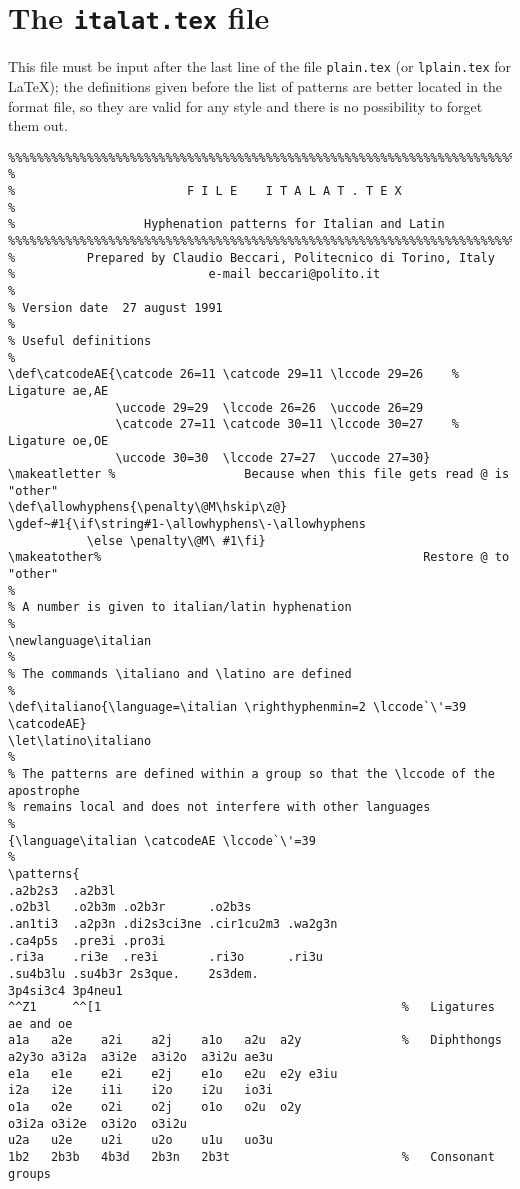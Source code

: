 \section{The {\tt italat.tex} file}
This  file must be input after the last line of the file {\tt plain.tex} (or
{\tt lplain.tex} for \LaTeX); the  definitions  given  before  the  list  of
patterns  are  better  located in the format file, so they are valid for any
style and there is no possibility to forget them out.
 \small
\begin{verbatim}
%%%%%%%%%%%%%%%%%%%%%%%%%%%%%%%%%%%%%%%%%%%%%%%%%%%%%%%%%%%%%%%%%%%%%%%%%%%%
%
%                        F I L E    I T A L A T . T E X
%
%                  Hyphenation patterns for Italian and Latin
%%%%%%%%%%%%%%%%%%%%%%%%%%%%%%%%%%%%%%%%%%%%%%%%%%%%%%%%%%%%%%%%%%%%%%%%%%%%
%          Prepared by Claudio Beccari, Politecnico di Torino, Italy
%                           e-mail beccari@polito.it
%
% Version date  27 august 1991
%
% Useful definitions 
%
\def\catcodeAE{\catcode 26=11 \catcode 29=11 \lccode 29=26    % Ligature ae,AE
               \uccode 29=29  \lccode 26=26  \uccode 26=29
               \catcode 27=11 \catcode 30=11 \lccode 30=27    % Ligature oe,OE
               \uccode 30=30  \lccode 27=27  \uccode 27=30}
\makeatletter %                  Because when this file gets read @ is "other"
\def\allowhyphens{\penalty\@M\hskip\z@}
\gdef~#1{\if\string#1-\allowhyphens\-\allowhyphens
           \else \penalty\@M\ #1\fi}
\makeatother%                                             Restore @ to "other"
%
% A number is given to italian/latin hyphenation
%
\newlanguage\italian
%
% The commands \italiano and \latino are defined
%
\def\italiano{\language=\italian \righthyphenmin=2 \lccode`\'=39 \catcodeAE}
\let\latino\italiano
%
% The patterns are defined within a group so that the \lccode of the apostrophe
% remains local and does not interfere with other languages
%
{\language\italian \catcodeAE \lccode`\'=39
%
\patterns{
.a2b2s3  .a2b3l
.o2b3l   .o2b3m .o2b3r      .o2b3s
.an1ti3  .a2p3n .di2s3ci3ne .cir1cu2m3 .wa2g3n
.ca4p5s  .pre3i .pro3i
.ri3a    .ri3e  .re3i       .ri3o      .ri3u
.su4b3lu .su4b3r 2s3que.    2s3dem.
3p4si3c4 3p4neu1
^^Z1     ^^[1                                          %   Ligatures ae and oe
a1a   a2e    a2i    a2j    a1o   a2u  a2y              %   Diphthongs
a2y3o a3i2a  a3i2e  a3i2o  a3i2u ae3u
e1a   e1e    e2i    e2j    e1o   e2u  e2y e3iu
i2a   i2e    i1i    i2o    i2u   io3i
o1a   o2e    o2i    o2j    o1o   o2u  o2y
o3i2a o3i2e  o3i2o  o3i2u
u2a   u2e    u2i    u2o    u1u   uo3u
1b2   2b3b   4b3d   2b3n   2b3t                        %   Consonant groups

\end{verbatim}
